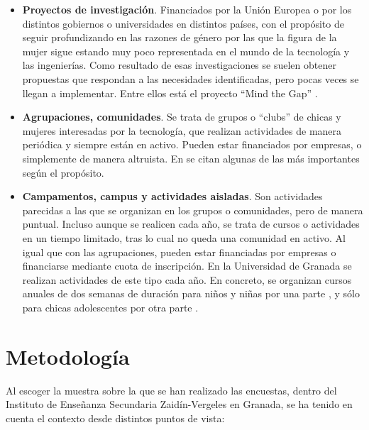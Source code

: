 \documentclass[runningheads,a4paper]{llncs}
\begin{document}
\begin{itemize}
  \item \textbf{Proyectos de investigación}. Financiados por la Unión Europea o por los distintos gobiernos o universidades en distintos países, con el propósito de seguir profundizando en las razones de género por las que la figura de la mujer sigue estando muy poco representada en el mundo de la tecnología y las ingenierías. Como resultado de esas investigaciones se suelen obtener propuestas que respondan a las necesidades identificadas, pero pocas veces se llegan a implementar. Entre ellos está el proyecto ``Mind the Gap'' \cite{mtg:site}.
  \item \textbf{Agrupaciones, comunidades}. Se trata de grupos o ``clubs'' de chicas y mujeres interesadas por la tecnología, que realizan actividades de manera periódica y siempre están en activo. Pueden estar financiados por empresas, o simplemente de manera altruista. En \cite{kira2012} se citan algunas de las más importantes según el propósito.
  \item \textbf{Campamentos, campus y actividades aisladas}. Son actividades parecidas a las que se organizan en los grupos o comunidades, pero de manera puntual. Incluso aunque se realicen cada año, se trata de cursos o actividades en un tiempo limitado, tras lo cual no queda una comunidad en activo. Al igual que con las agrupaciones, pueden estar financiadas por empresas o financiarse mediante cuota de inscripción. En la Universidad de Granada se realizan actividades de este tipo cada año. En concreto, se organizan cursos anuales de dos semanas de duración para niños y niñas por una parte \cite{cinfant:site}, y sólo para chicas adolescentes por otra parte \cite{cchicas:site}.
\end{itemize}

\section{Metodología}
\label{sec:metodologia}

Al escoger la muestra sobre la que se han realizado las encuestas, dentro del Instituto de Enseñanza Secundaria Zaidín-Vergeles en Granada, se ha tenido en cuenta el contexto desde distintos puntos de vista:
\end{document}
